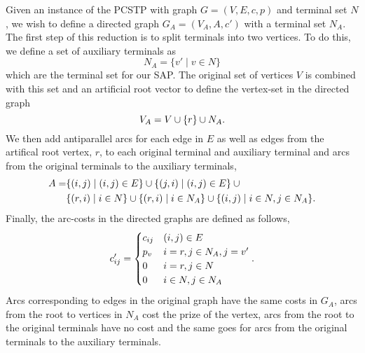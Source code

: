 Given an instance of the PCSTP with graph $G = (V,E,c,p)$ and terminal set $N$, we wish to define
 a directed graph $G_A = (V_A, A, c')$ with a terminal set $N_A$. The first
 step of this reduction is to split terminals into two vertices.
 To do this, we define a
set of auxiliary terminals as
$$N_A = \{v' \mid v \in N\}$$
which are the terminal set for our SAP.
The original set of vertices $V$ is combined with this set and an
artificial root vector to define the vertex-set in the directed graph
$$V_A = V \cup \{r\} \cup N_A\mathnormal{.}$$
We then add antiparallel arcs for each edge in $E$ as well as edges from the artifical root vertex, $r$,
to each original terminal and auxiliary terminal and arcs from the original terminals to the auxiliary
terminals,
\begin{align*}
A = &\{(i,j) \mid (i,j) \in E \} \cup \{ (j,i) \mid (i,j) \in E \} \:\cup \\
&\{(r, i) \mid i \in N\} \cup \{(r,i) \mid i \in N_A\} \cup \{(i,j) \mid i \in N, j \in N_A\}\mathnormal{.}
\end{align*}
Finally, the arc-costs in the directed graphs are defined as follows,
$$c'_{ij} =
\begin{cases}
  c_{ij} & (i,j) \in E \\
  p_v & i = r, j \in N_A , j = v' \\
  0 & i = r, j \in N \\
  0 & i \in N, j \in N_A
\end{cases}\textnormal{.}$$
Arcs corresponding to edges in the original graph have the same costs in $G_A$, arcs from the root
to vertices in $N_A$ cost the prize of the vertex, arcs from the root to the original terminals
have no cost and the same goes for arcs from the original terminals to the auxiliary terminals.

